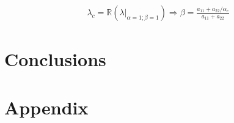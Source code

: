 \documentclass[a4paper,10pt,onecolumn]{article} %
\begin{document}

\begin{equation}
\label{eq:beta}
\begin{split}
\lambda_c=\mathbb{R}\left(\lambda\rvert_{\alpha=1;\beta=1}\right) \Rightarrow \beta=\frac{a_{11}+a_{22}/\alpha_c}{a_{11}+a_{22}}
\end{split}
\end{equation}

%
\section{Conclusions}
\label{sec:c}
%


%
%
\appendix

%
\section{Appendix}
\label{app:c}
%

%
%
\DeclareRobustCommand{\van}[3]{#3}

%

	
\end{document}
